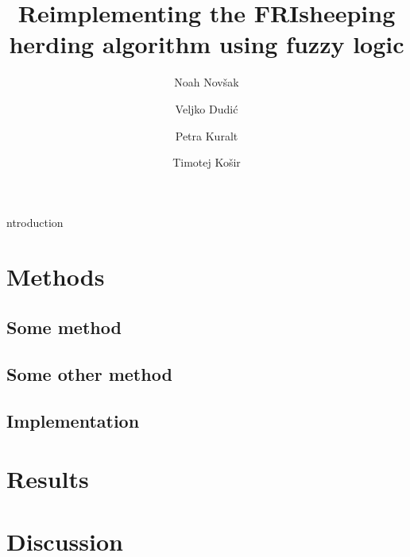\documentclass[9pt]{pnas-new}
\title{Reimplementing the FRIsheeping herding algorithm using fuzzy logic}
\author{Noah Novšak}
\author{Veljko Dudić}
\author{Petra Kuralt}
\author{Timotej Košir}
\affil{Collective behavior course research seminar report}
\begin{document}
\verticaladjustment{-2pt}

\maketitle
\thispagestyle{firststyle}

ntroduction
\cite{shepherdingalgorithm}
\cite{herdingalgorithm}
\cite{fuzzymodel}
\cite{flocktransport}
\cite{crowdmodelling}

\section*{Methods}

\subsection*{Some method}

\subsection*{Some other method}

\subsection*{Implementation}

\section*{Results}

\section*{Discussion}

\showacknow %


\begin{multicols}{2}
\section*{\bibname}

\end{multicols}
\end{document}
